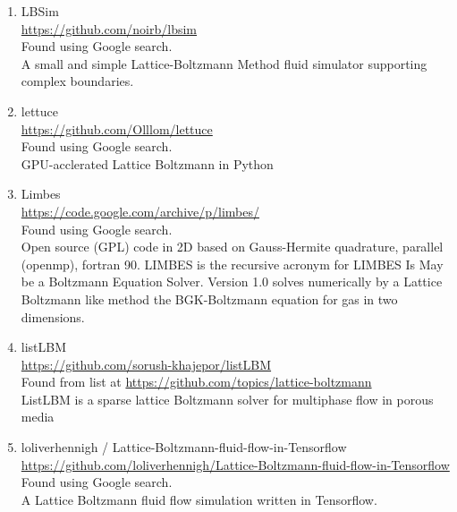 \documentclass{article}
\begin{document}
\begin{enumerate}
\item LBSim
\\
\href{https://github.com/noirb/lbsim}{https://github.com/noirb/lbsim}
\\
Found using Google search.\\
A small and simple Lattice-Boltzmann Method fluid simulator supporting complex boundaries.

\item lettuce
\\
\href{https://github.com/Olllom/lettuce}{https://github.com/Olllom/lettuce}
\\
Found using Google search.\\
GPU-acclerated Lattice Boltzmann in Python

\item Limbes
\\
\href{https://code.google.com/archive/p/limbes/}{https://code.google.com/archive/p/limbes/} \\
Found using Google search.\\
Open source (GPL) code in 2D based on Gauss-Hermite quadrature, parallel (openmp), fortran 90. LIMBES is the recursive acronym for LIMBES Is May be a Boltzmann Equation Solver. Version 1.0 solves numerically by a Lattice Boltzmann like method the BGK-Boltzmann equation for gas in two dimensions.

\item listLBM
\\
\href{https://github.com/sorush-khajepor/listLBM}{https://github.com/sorush-khajepor/listLBM} \\
Found from list at \href{https://github.com/topics/lattice-boltzmann}{https://github.com/topics/lattice-boltzmann}\\
ListLBM is a sparse lattice Boltzmann solver for multiphase flow in porous media

\item  loliverhennigh /
Lattice-Boltzmann-fluid-flow-in-Tensorflow 
\\
\href{https://github.com/loliverhennigh/Lattice-Boltzmann-fluid-flow-in-Tensorflow}{https://github.com/loliverhennigh/Lattice-Boltzmann-fluid-flow-in-Tensorflow}
\\
Found using Google search.\\
A Lattice Boltzmann fluid flow simulation written in Tensorflow. 


\end{enumerate}
\end{document}
